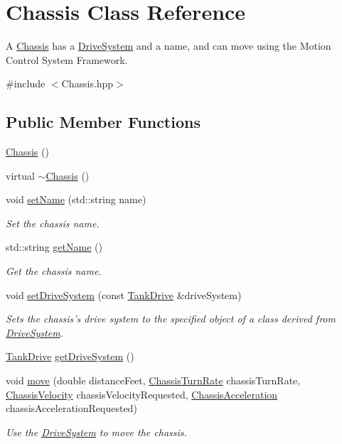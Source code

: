 \hypertarget{classChassis}{\section{Chassis Class Reference}
\label{classChassis}
}


A \hyperlink{classChassis}{Chassis} has a \hyperlink{classDriveSystem}{Drive\-System} and a name, and can move using the Motion Control System Framework.  




{\ttfamily \#include $<$Chassis.\-hpp$>$}

\subsection*{Public Member Functions}
\begin{DoxyCompactItemize}
\item 
\hyperlink{classChassis_abff4a95e18eea726bccbb647939b2141}{Chassis} ()
\item 
virtual \hyperlink{classChassis_a75880fe86a5e5fcadee712908f52e658}{$\sim$\-Chassis} ()
\item 
void \hyperlink{classChassis_ad50f86ab08f17f5b12e720c83eaf8ecc}{set\-Name} (std\-::string name)
\begin{DoxyCompactList}\small\item\em Set the chassis name. \end{DoxyCompactList}\item 
std\-::string \hyperlink{classChassis_a9cadf36721b16e153410349ce3c3644a}{get\-Name} ()
\begin{DoxyCompactList}\small\item\em Get the chassis name. \end{DoxyCompactList}\item 
void \hyperlink{classChassis_a1b0a7d94f3db91361557c58fa049d39e}{set\-Drive\-System} (const \hyperlink{classTankDrive}{Tank\-Drive} \&drive\-System)
\begin{DoxyCompactList}\small\item\em Sets the chassis's drive system to the specified object of a class derived from \hyperlink{classDriveSystem}{Drive\-System}. \end{DoxyCompactList}\item 
\hyperlink{classTankDrive}{Tank\-Drive} \hyperlink{classChassis_ac91e9c94d479cf887ec66f282c05d81f}{get\-Drive\-System} ()
\item 
void \hyperlink{classChassis_a7882d0edfd3ad7208bf0568074acd93f}{move} (double distance\-Feet, \hyperlink{classChassisTurnRate}{Chassis\-Turn\-Rate} chassis\-Turn\-Rate, \hyperlink{classChassisVelocity}{Chassis\-Velocity} chassis\-Velocity\-Requested, \hyperlink{classChassisAcceleration}{Chassis\-Acceleration} chassis\-Acceleration\-Requested)
\begin{DoxyCompactList}\small\item\em Use the \hyperlink{classDriveSystem}{Drive\-System} to move the chassis. \end{DoxyCompactList}\end{DoxyCompactItemize}
